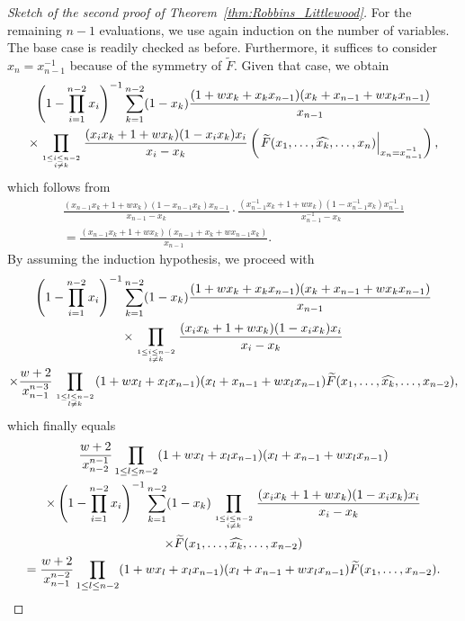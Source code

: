 \documentclass[ALCO, Unicode]{cedram}
\newcommand\myatop[2]{\genfrac{}{}{0pt}{}{#1}{#2}}
\begin{document}
\begin{proof}[Sketch of the second proof of Theorem~\ref{thm:Robbins_Littlewood}]
		For the remaining $n-1$ evaluations, we use again induction on the number of variables. The base case is readily checked as before. Furthermore, it suffices to consider $x_n=x_{n-1}^{-1}$ because of the symmetry of $\widetilde{F}$. Given that case, we obtain
		\begin{multline*}
			\left(1-\prod_{i=1}^{n-2} x_i \right)^{-1} \sum\limits_{k=1}^{n-2} (1-x_k) \frac{(1+w x_k+x_k x_{n-1})(x_k+x_{n-1}+w x_k x_{n-1})}{x_{n-1}}\\
			\times\prod\limits_{\myatop{1 \le i \le n-2}{i \neq k}} \frac{(x_i x_k+1+w x_k) (1-x_i x_k) x_i}{x_i-x_k}
			\left(\left.\widetilde{F}(x_1,\ldots,\widehat{x_k},\ldots,x_n)\right\vert_{x_n=x_{n-1}^{-1}}\right),
		\end{multline*}
		which follows from
		\begin{multline*}
			\frac{(x_{n-1} x_k +1+w x_k)(1-x_{n-1} x_k) x_{n-1}}{x_{n-1}-x_k} \cdot\frac{(x_{n-1}^{-1} x_k +1+w x_k)(1-x_{n-1}^{-1} x_k) x_{n-1}^{-1}}{x_{n-1}^{-1}-x_k}\\
			= \frac{(x_{n-1} x_k +1+w x_k)(x_{n-1}+x_k+w x_{n-1} x_k)}{x_{n-1}}.
		\end{multline*}
		By assuming the induction hypothesis, we proceed with
		\begin{multline*}
			\left(1-\prod_{i=1}^{n-2} x_i \right)^{-1} \sum\limits_{k=1}^{n-2} (1-x_k) \frac{(1+w x_k+x_k x_{n-1})(x_k+x_{n-1}+w x_k x_{n-1})}{x_{n-1}}\\ \times\prod\limits_{\myatop{1 \le i \le n-2}{i \neq k}} \frac{(x_i x_k+1+w x_k) (1-x_i x_k) x_i}{x_i-x_k}\\
			\times \frac{w+2}{x_{n-1}^{n-3}} \prod_{\myatop{1 \le l \le n-2}{l \neq k}} (1 + w x_l + x_l x_{n-1})(x_l + x_{n-1} + w x_l x_{n-1}) \widetilde{F}(x_1,\dots,\widehat{x_k},\dots,x_{n-2}),
		\end{multline*}
		which finally equals
		\begin{multline*}
			\frac{w+2}{x_{n-2}^{n-1}} \prod_{1 \le l \le n-2} (1 + w x_l + x_l x_{n-1})(x_l + x_{n-1} + w x_l x_{n-1})\\
			\times \left(1-\prod_{i=1}^{n-2} x_i \right)^{-1} \sum\limits_{k=1}^{n-2} (1-x_k) \prod\limits_{\myatop{1 \le i \le n-2}{i \neq k}} \frac{(x_i x_k+1+w x_k) (1-x_i x_k) x_i}{x_i-x_k}\\ \times \widetilde{F}(x_1,\dots,\widehat{x_k},\dots,x_{n-2})\\
			= \frac{w+2}{x_{n-1}^{n-2}} \prod_{1 \le l \le n-2} (1 + w x_l + x_l x_{n-1})(x_l + x_{n-1} + w x_l x_{n-1}) \widetilde{F}(x_1,\dots,x_{n-2}).
		\end{multline*}
	\end{proof}
	
\end{document}

